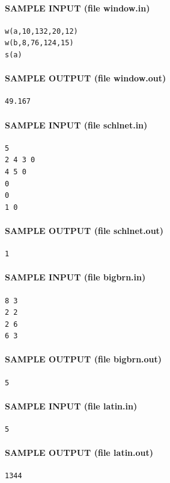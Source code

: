 \documentclass[11pt]{article}
\begin{document}
\paragraph{SAMPLE INPUT (file window.in)}
\begin{verbatim}
w(a,10,132,20,12)
w(b,8,76,124,15)
s(a)
\end{verbatim}

\paragraph{SAMPLE OUTPUT (file window.out)}
\begin{verbatim}
49.167
\end{verbatim}

\paragraph{SAMPLE INPUT (file schlnet.in)}
\begin{verbatim}
5
2 4 3 0
4 5 0
0
0
1 0
\end{verbatim}

\paragraph{SAMPLE OUTPUT (file schlnet.out)}
\begin{verbatim}
1
\end{verbatim}

\paragraph{SAMPLE INPUT (file bigbrn.in)}
\begin{verbatim}
8 3
2 2
2 6
6 3
\end{verbatim}

\paragraph{SAMPLE OUTPUT (file bigbrn.out)}
\begin{verbatim}
5
\end{verbatim}

\paragraph{SAMPLE INPUT (file latin.in)}
\begin{verbatim}
5
\end{verbatim}

\paragraph{SAMPLE OUTPUT (file latin.out)}
\begin{verbatim}
1344
\end{verbatim}
\end{document}
